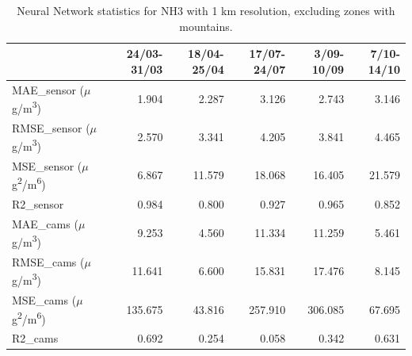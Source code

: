 \begin{table}[H]
\begin{tabular}{lrrrrr}
\toprule
 &  24/03-31/03 &  18/04-25/04 &  17/07-24/07 &  3/09-10/09 &  7/10-14/10 \\
\midrule
 MAE\_sensor ($\mu$g/m\textsuperscript{3})&        1.904 &        2.287 &        3.126 &       2.743 &       3.146 \\
RMSE\_sensor ($\mu$g/m\textsuperscript{3})&        2.570 &        3.341 &        4.205 &       3.841 &       4.465 \\
 MSE\_sensor ($\mu$g\textsuperscript{2}/m\textsuperscript{6})&        6.867 &       11.579 &       18.068 &      16.405 &      21.579 \\
  R2\_sensor &        0.984 &        0.800 &        0.927 &       0.965 &       0.852 \\
   MAE\_cams ($\mu$g/m\textsuperscript{3})&        9.253 &        4.560 &       11.334 &      11.259 &       5.461 \\
  RMSE\_cams ($\mu$g/m\textsuperscript{3})&       11.641 &        6.600 &       15.831 &      17.476 &       8.145 \\
   MSE\_cams ($\mu$g\textsuperscript{2}/m\textsuperscript{6})&      135.675 &       43.816 &      257.910 &     306.085 &      67.695 \\
    R2\_cams &        0.692 &        0.254 &        0.058 &       0.342 &       0.631 \\
\bottomrule
\end{tabular}
\caption{Neural Network statistics for NH3 with 1 km resolution, excluding zones with mountains.}
\end{table}

